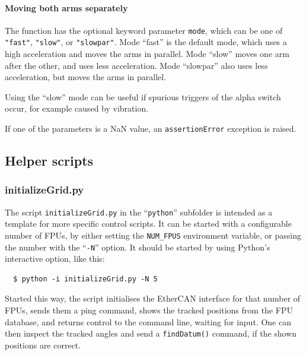 \documentclass[11pt,a4paper]{scrartcl}
\begin{document}
\paragraph{Moving both arms separately}

The function has the optional keyword parameter \texttt{mode}, which
can be one of \texttt{"fast"}, \texttt{"slow"}, or \texttt{"slowpar"}.
Mode ``fast'' is the default mode, which uses a high acceleration and
moves the arms in parallel. Mode ``slow'' moves one arm after the
other, and uses less acceleration. Mode ``slowpar'' also uses less
acceleration, but moves the arms in parallel.

Using the ``slow'' mode can be useful if spurious triggers of the
alpha switch occur, for example caused by vibration.

If one of the parameters is a NaN value, an \texttt{assertionError}
exception is raised.

\subsection{Helper scripts}

\subsubsection{initializeGrid.py}
\label{sec:initializegrid}

The script \texttt{initializeGrid.py} in the ``\texttt{python}''
subfolder is intended as a template for more specific control scripts.
It can be started with a configurable number of FPUs, by either
setting the \texttt{NUM\_FPUS} environment variable, or passing the
number with the ``\texttt{-N}'' option. It should be started by using
Python's interactive option, like this:

\begin{verbatim}
  $ python -i initializeGrid.py -N 5
\end{verbatim}

Started this way, the script initialises the EtherCAN interface for that number of
FPUs, sends them a ping command, shows the tracked positions from the
FPU database, and returns control to the command line, waiting for
input. One can then inspect the tracked angles and send a
\texttt{findDatum()} command, if the shown positions are correct.
\end{document}
